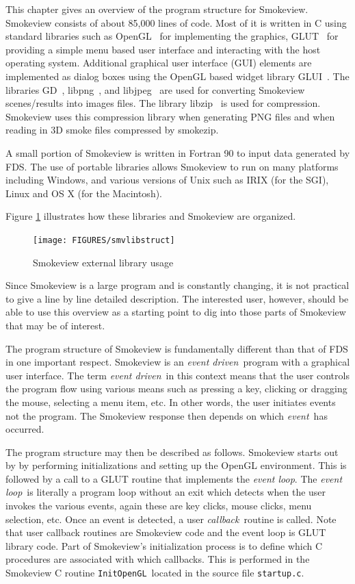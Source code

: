 \documentclass[11pt,twoside]{book}
\begin{document}
This chapter gives an overview of the program structure for
Smokeview. Smokeview consists of about 85,000 lines of code.  Most
of it is written in C using standard libraries such as
OpenGL~\cite{OpenGLRed} for implementing the graphics,
GLUT~\cite{OpenGLGlut} for providing a simple menu based user
interface and interacting with the host operating system.
Additional graphical user interface (GUI) elements are implemented
as dialog boxes using the OpenGL based widget library
GLUI~\cite{GLUILIB}. The libraries GD~\cite{GDLIB},
libpng~\cite{PNGLIB}, and libjpeg~\cite{JPEGLIB} are used for
converting Smokeview scenes/results into images files. The library
libzip~\cite{ZLIB} is used for compression. Smokeview uses this
compression library when generating PNG files and when reading in
3D smoke files compressed by smokezip.

A small portion of Smokeview is written in Fortran 90 to input
data generated by FDS.  The use of portable libraries allows
Smokeview to run on many platforms including Windows, and various
versions of Unix such as IRIX (for the SGI), Linux and OS X (for
the Macintosh).

Figure \ref{smvlibstruct} illustrates how these libraries and
Smokeview are organized.

\begin{figure}
\texttt{[image: FIGURES/smvlibstruct]}
\caption{Smokeview external library usage}
\label{smvlibstruct}
\end{figure}


Since Smokeview is a large program and is constantly changing, it
is not practical to give a line by line detailed description. The
interested user, however, should be able to use this overview as a
starting point to dig into those parts of Smokeview that may be of
interest.

The program structure of Smokeview is fundamentally different than
that of FDS in one important respect.  Smokeview is an {\em event
driven}\ program with a graphical user interface.  The term {\em
event driven}\ in this context means that the user controls the
program flow using various means such as pressing a key, clicking
or dragging the mouse, selecting a menu item, etc.  In other
words, the user initiates events not the program. The Smokeview
response then depends on which {\em event}\ has occurred.

The program structure may then be described as follows. Smokeview
starts out by by performing initializations and setting up the
OpenGL environment. This is followed by a call to a GLUT routine
that implements the {\em event loop}. The {\em event loop}\ is
literally a program loop without an exit which detects when the
user invokes the various events, again these are key clicks, mouse
clicks, menu selection, etc. Once an event is detected, a
user {\em callback}\ routine is called.  Note that user callback
routines are Smokeview code and the event loop is GLUT library
code. Part of Smokeview's initialization process is to define
which C procedures are associated with which callbacks.  This is
performed in the Smokeview C routine {\tt InitOpenGL}\ located in
the source file {\tt startup.c}.
\end{document}
